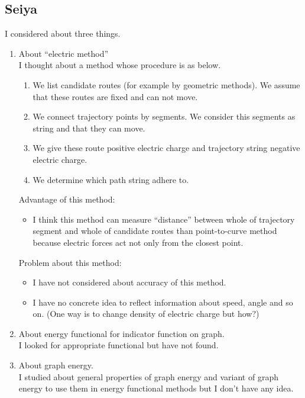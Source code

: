 \documentclass{article}
\numberwithin{equation}{section}
\theoremstyle{definition}
\begin{document}
\subsection*{Seiya}
I considered about three things.
\begin{enumerate}
    \item
    About ``electric method'' \\
    I thought about a method whose procedure is as below.
    \begin{enumerate}
        \item
        We list candidate routes (for example by geometric methods). We assume that these routes are fixed and can not move.
        \item
        We connect trajectory points by segments. We consider this segments as string and that they can move.
        \item
        We give these route positive electric charge and trajectory string negative electric charge.
        \item
        We determine which path string adhere to.
    \end{enumerate}
    
    Advantage of this method:
    \begin{itemize}
        \item
        I think this method can measure ``distance'' between whole of trajectory segment and whole of candidate routes than point-to-curve method because electric forces act not only from the closest point.
    \end{itemize}
    Problem about this method:
    \begin{itemize}
        \item 
        I have not considered about accuracy of this method.
        \item
        I have no concrete idea to reflect information about speed, angle and so on. 
        (One way is to change density of electric charge but how?)
    \end{itemize}
    
    \item
    About energy functional for indicator function on graph. \\
    I looked for appropriate functional but have not found. 
    \item
    About graph energy. \\
    I studied about general properties of graph energy and variant of graph energy to use them in energy functional methods but I don't have any idea. 
\end{enumerate}
\end{document}
